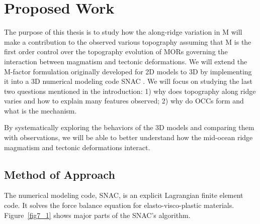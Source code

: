 \documentclass[12pt]{article}
\begin{document}
\break
\section{Proposed Work}
\label{ch:purpose}

The purpose of this thesis is to study how the along-ridge variation in M will make a contribution to the observed various topography assuming that M is the first order control over the topography evolution of MORs governing the interaction between magmatism and tectonic deformations.
We will extend the M-factor formulation originally developed for 2D models to 3D by implementing it into a 3D numerical modeling code SNAC \citep{Choi2008}. We will focus on studying the last two questions mentioned in the introduction: 1) why does topography along ridge varies and how to explain many features observed; 2) why do OCCs form and what is the mechanism. 

By systematically exploring the behaviors of the 3D models and comparing them with observations, we will be able to better understand  how the mid-ocean ridge magmatism and tectonic deformations interact. 

\break
\subsection{Method of Approach}
\label{ch:method}

%

The numerical modeling code, SNAC, is an explicit Lagrangian finite element code. It solves the force balance equation for elasto-visco-plastic materials. Figure~\ref{fig7_1} shows major parts of the SNAC's algorithm. 
\end{document}
